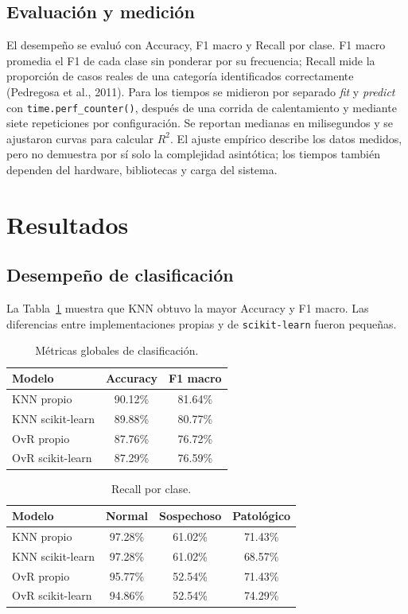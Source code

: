 \documentclass[10pt,letterpaper,twocolumn]{article}
\begin{document}
\subsection{Evaluación y medición}
El desempeño se evaluó con Accuracy, F1 macro y Recall por clase. F1 macro promedia el F1 de cada clase sin ponderar por su frecuencia; Recall mide la proporción de casos reales de una categoría identificados correctamente (Pedregosa et al., 2011). Para los tiempos se midieron por separado \textit{fit} y \textit{predict} con \texttt{time.perf\_counter()}, después de una corrida de calentamiento y mediante siete repeticiones por configuración. Se reportan medianas en milisegundos y se ajustaron curvas para calcular $R^2$. El ajuste empírico describe los datos medidos, pero no demuestra por sí solo la complejidad asintótica; los tiempos también dependen del hardware, bibliotecas y carga del sistema.

\section{Resultados}
\subsection{Desempeño de clasificación}
La Tabla~\ref{tab:clasificacion} muestra que KNN obtuvo la mayor Accuracy y F1 macro. Las diferencias entre implementaciones propias y de \texttt{scikit-learn} fueron pequeñas.
\begin{table}[H]
\centering
\caption{Métricas globales de clasificación.}
\label{tab:clasificacion}
\scriptsize
\begin{tabular}{lcc}
\toprule
\textbf{Modelo} & \textbf{Accuracy} & \textbf{F1 macro}\\
\midrule
KNN propio & 90.12\% & 81.64\%\\
KNN scikit-learn & 89.88\% & 80.77\%\\
OvR propio & 87.76\% & 76.72\%\\
OvR scikit-learn & 87.29\% & 76.59\%\\
\bottomrule
\end{tabular}
\end{table}

\begin{table}[H]
\centering
\caption{Recall por clase.}
\label{tab:recall}
\scriptsize
\begin{tabular}{lccc}
\toprule
\textbf{Modelo} & \textbf{Normal} & \textbf{Sospechoso} & \textbf{Patológico}\\
\midrule
KNN propio & 97.28\% & 61.02\% & 71.43\%\\
KNN scikit-learn & 97.28\% & 61.02\% & 68.57\%\\
OvR propio & 95.77\% & 52.54\% & 71.43\%\\
OvR scikit-learn & 94.86\% & 52.54\% & 74.29\%\\
\bottomrule
\end{tabular}
\end{table}
\end{document}
